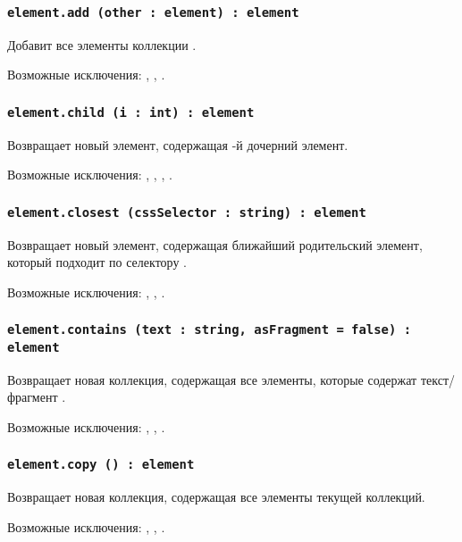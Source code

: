 \subsubsection{\lstinline|element.add (other : element) : element|}

Добавит все элементы коллекции .

Возможные исключения: , , .

\subsubsection{\lstinline|element.child (i : int) : element|}

Возвращает новый элемент, содержащая -й дочерний элемент.

Возможные исключения: , , , .

\subsubsection{\lstinline|element.closest (cssSelector : string) : element|}

Возвращает новый элемент, содержащая ближайший родительский элемент, который подходит по селектору .

Возможные исключения: , , .

\subsubsection{\lstinline|element.contains (text : string, asFragment = false) : element|}

Возвращает новая коллекция, содержащая все элементы, которые содержат текст/фрагмент .

Возможные исключения: , , .

\subsubsection{\lstinline|element.copy () : element|}

Возвращает новая коллекция, содержащая все элементы текущей коллекций.

Возможные исключения: , , .

